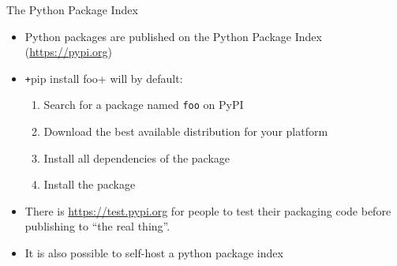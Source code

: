 \begin{frame}[c]{The Python Package Index}
  \begin{itemize}
    \item Python packages are published on the Python Package Index (\url{https://pypi.org})
    \item \texttt+pip install foo+ will by default:
      \begin{enumerate}
        \item Search for a package named \texttt{foo} on PyPI
        \item Download the best available distribution for your platform
        \item Install all dependencies of the package
        \item Install the package
      \end{enumerate}
    \item There is \url{https://test.pypi.org} for people to test their packaging code before
      publishing to \enquote{the real thing}.
    \item It is also possible to self-host a python package index
  \end{itemize}
\end{frame}

